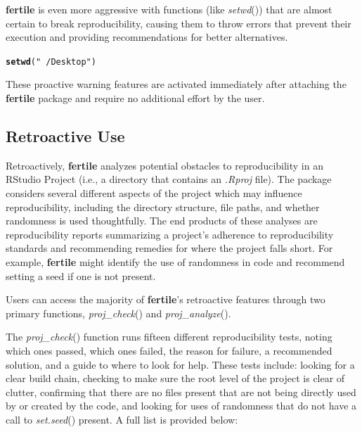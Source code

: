 \documentclass[APA,LATO1COL]{WileyNJD-v2}\usepackage[]{graphicx}\usepackage[]{color}
\makeatletter
\newcommand{\hlstr}[1]{\textcolor[rgb]{0.192,0.494,0.8}{#1}}%
\newcommand{\hlstd}[1]{\textcolor[rgb]{0.345,0.345,0.345}{#1}}%
\newcommand{\hlkwd}[1]{\textcolor[rgb]{0.737,0.353,0.396}{\textbf{#1}}}%
\newenvironment{kframe}{%
 \def\at@end@of@kframe{}%
 \ifinner\ifhmode%
  \def\at@end@of@kframe{\end{minipage}}%
  \begin{minipage}{\columnwidth}%
 \fi\fi%
 \def\FrameCommand##1{\hskip\@totalleftmargin \hskip-\fboxsep
 \colorbox{shadecolor}{##1}\hskip-\fboxsep
     \hskip-\linewidth \hskip-\@totalleftmargin \hskip\columnwidth}%
 \MakeFramed {\advance\hsize-\width
   \@totalleftmargin\z@ \linewidth\hsize
   \@setminipage}}%
 {\par\unskip\endMakeFramed%
 \at@end@of@kframe}
\newenvironment{knitrout}{}{} %
\newcommand{\cmd}[1]{\textit{#1}}
\newcommand{\pkg}[1]{\textbf{#1}}
\newcommand{\func}[1]{\textit{#1}()}
\makeatother
\begin{document}
\pkg{fertile} is even more aggressive with functions (like \func{setwd}) that are almost certain to break reproducibility, causing them to throw errors that prevent their execution and providing recommendations for better alternatives.

\begin{knitrout}
\color{fgcolor}\begin{kframe}
\begin{alltt}
\hlkwd{setwd}\hlstd{(}\hlstr{"~/Desktop"}\hlstd{)}
\end{alltt}


{\ttfamily\noindent\bfseries\color{errorcolor}{\#\# Error: setwd() is likely to break reproducibility. Use here::here() instead.}}\end{kframe}
\end{knitrout}

These proactive warning features are activated immediately after attaching the \pkg{fertile} package and require no additional effort by the user.

\subsection{Retroactive Use}

Retroactively, \pkg{fertile} analyzes potential obstacles to reproducibility in an RStudio Project (i.e., a directory that contains an \cmd{.Rproj} file). The package considers several different aspects of the project which may influence reproducibility, including the directory structure, file paths, and whether randomness is used thoughtfully.
The end products of these analyses are reproducibility reports summarizing a project's adherence to reproducibility standards and recommending remedies for where the project falls short. For example, \pkg{fertile} might identify the use of randomness in code and recommend setting a seed if one is not present.

Users can access the majority of \pkg{fertile}'s retroactive features through two primary functions, \func{proj\_check} and \func{proj\_analyze}. 

The \func{proj\_check} function runs fifteen different reproducibility tests, noting which ones passed, which ones failed, the reason for failure, a recommended solution, and a guide to where to look for help. These tests include: looking for a clear build chain, checking to make sure the root level of the project is clear of clutter, confirming that there are no files present that are not being directly used by or created by the code, and looking for uses of randomness that do not have a call to \func{set.seed} present. A full list is provided below:
\end{document}
